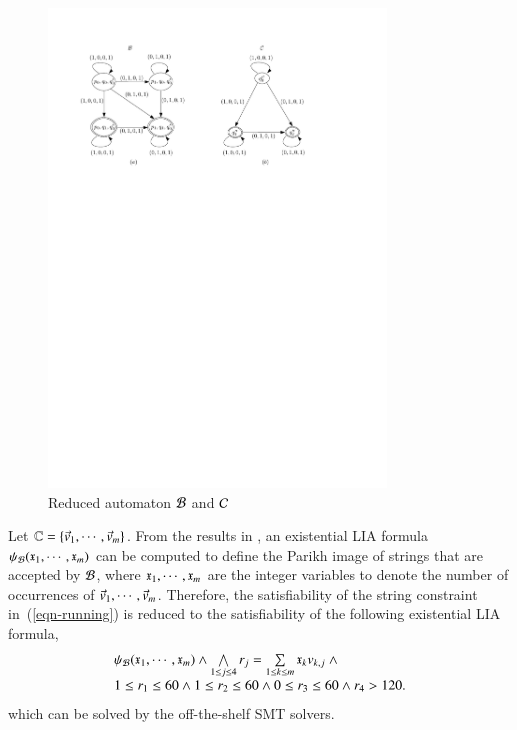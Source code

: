 \begin{figure}[ht]
\vspace{-2mm}
  \centering
  \includegraphics[width = 0.8\textwidth]{sections/overview-cefa-reduced.pdf}
  \caption{Reduced automaton $\mathcal{B}$ and $\mathcal{C}$}
  \label{fig:overview:product:reduced}
\vspace{-4mm}
\end{figure}
%
Let $\mathbb{C} = \{\vec{v}_1, \cdots, \vec{v}_m\}$. 
From the results in \cite{SSMH04,VSS05}, an existential LIA formula $\psi_{\mathcal{B}}(\mathfrak{x}_1, \cdots, \mathfrak{x}_m)$ can be computed to define the Parikh image of strings that are accepted by $\mathcal{B}$, where $\mathfrak{x}_1, \cdots, \mathfrak{x}_m$ are the integer variables to denote the number of occurrences of $\vec{v}_1, \cdots, \vec{v}_m$.
Therefore, the satisfiability of the string constraint in~(\ref{eqn-running}) is reduced to the satisfiability of the following existential LIA formula,
\begin{equation}\label{eqn-LIA}
\begin{array}{l}
\psi_{\mathcal{B}}(\mathfrak{x}_1, \cdots, \mathfrak{x}_m) \wedge \bigwedge \limits_{1 \le j \le 4} r_j = \sum \limits_{1\le k \le m}  \mathfrak{x}_k v_{k, j}\ \wedge \\
1 \le r_1 \le 60 \wedge 1 \le r_2 \le 60 \wedge 0 \le r_3 \le 60 \wedge r_4 > 120.
\end{array}
\end{equation}
which can be solved by the off-the-shelf SMT solvers.

